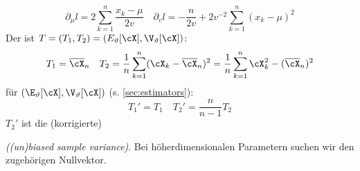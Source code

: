 \[
    \partial_{\mu} l = 2 \sum_{k = 1}^{n} \frac{x_k - \mu}{2 v}
    \quad
    \partial_v l = -\frac{n}{2v} + 2v^{-2}\sum_{k = 1}^{n} (x_k - \mu)^2
\]
Der  ist $T = (T_1, T_2) = (E_\vartheta[\cX], \V_\vartheta[\cX])$:
\[
    T_1 = \overline{\cX}_n
    \quad
    T_2 = \frac{1}{n} \sum_{k = 1}^{n} (\cX_k - \overline{\cX}_n)^2 = \frac{1}{n} \sum_{k = 1}^{n} \cX^2_k - (\overline{\cX}_n)^2
\]
 für $(\E_\vartheta[\cX], \V_\vartheta[\cX])$ (s. \ref{sec:estimators}):
\[
    T_1' = T_1 \quad
    T_2' = \frac{n}{n - 1} T_2
\]
$T_2'$ ist die (korrigierte) 

{\scriptsize
    \textit{((un)biased sample variance)}.
    Bei höherdimensionalen Parametern suchen wir den zugehörigen Nullvektor.}
